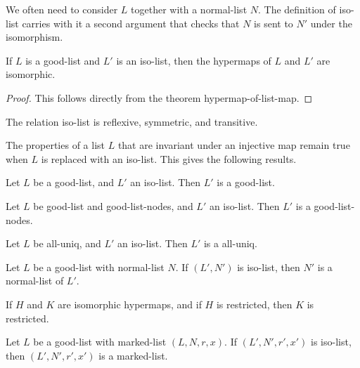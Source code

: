 We often need to consider $L$ together with a normal-list $N$.  The definition of iso-list carries with it
a second argument that checks that $N$ is sent to $N'$ under the isomorphism.

\begin{lemma}
If $L$ is a good-list and $L'$ is an iso-list, then the hypermaps of $L$ and $L'$ are isomorphic.
\end{lemma}

\begin{proof} This follows directly from the theorem hypermap-of-list-map.
\end{proof}

\begin{lemma}  
The relation iso-list is reflexive, symmetric, and transitive.
\end{lemma}

The properties of a list $L$ that are invariant under an injective map remain true when $L$ is replaced
with an iso-list.  This gives the following results.

\begin{lemma}
Let $L$ be a good-list, and $L'$ an iso-list.  Then $L'$ is a good-list.
\end{lemma}

\begin{lemma}
Let $L$ be good-list and good-list-nodes, and $L'$ an iso-list.  Then $L'$ is a good-list-nodes.
\end{lemma}

\begin{lemma} 
Let $L$ be all-uniq, and $L'$ an iso-list.  Then $L'$ is a all-uniq.
\end{lemma}

\begin{lemma}
 Let $L$ be a good-list with normal-list $N$.  If $(L',N')$ is iso-list, then $N'$ is a normal-list of $L'$.
\end{lemma}

\begin{lemma}
If $H$ and $K$ are isomorphic hypermaps, and if $H$ is restricted, then $K$ is restricted.
\end{lemma}

\begin{lemma}
Let $L$ be a good-list with marked-list $(L,N,r,x)$.  If $(L',N',r',x')$ is iso-list, then $(L',N',r',x')$ is a marked-list.
\end{lemma}



